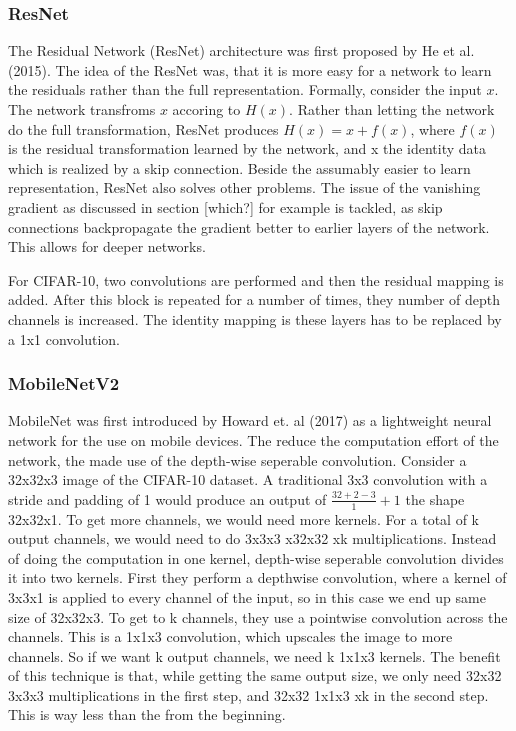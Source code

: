 \subsubsection{ResNet}
The Residual Network (ResNet) architecture was first proposed by He et al.
(2015). The idea of the ResNet was, that it is more easy for a network to learn
the residuals rather than the full representation. Formally, consider the input
$x$. The network transfroms $x$ accoring to $H(x)$. Rather than letting the
network do the full transformation, ResNet produces $H(x)= x +f(x)$, where
$f(x)$ is the residual transformation learned by the network, and x the identity
data which is realized by a skip connection. Beside the assumably easier to
learn representation, ResNet also solves other problems. The issue of the
vanishing gradient as discussed in section [which?] for example is tackled, as
skip connections backpropagate the gradient better to earlier layers of the
network. This allows for deeper networks.

For CIFAR-10, two convolutions are performed and then the residual mapping is
added. After this block is repeated for a number of times, they number of depth
channels is increased. The identity mapping is these layers has to be replaced
by a 1x1 convolution.


\subsubsection{MobileNetV2}
MobileNet was first introduced by Howard et. al (2017) as a lightweight neural
network for the use on mobile devices. The reduce the computation effort of the
network, the made use of the depth-wise seperable convolution. Consider a
32x32x3 image of the CIFAR-10 dataset. A traditional 3x3 convolution with a
stride and padding of 1 would produce an output of $\frac{32+2-3}{1}+1$ the
shape 32x32x1. To get more channels, we would need more kernels. For a total of
k output channels, we would need to do 3x3x3 x32x32 xk multiplications. Instead
of doing the computation in one kernel, depth-wise seperable convolution divides
it into two kernels. First they perform a depthwise convolution, where a kernel
of 3x3x1 is applied to every channel of the input, so in this case we end up
same size of 32x32x3. To get to k channels, they use a pointwise convolution
across the channels. This is a 1x1x3 convolution, which upscales the image to
more channels. So if we want k output channels, we need k 1x1x3 kernels. The
benefit of this technique is that, while getting the same output size, we only
need 32x32 3x3x3 multiplications in the first step, and 32x32 1x1x3 xk in the
second step. This is way less than the from the beginning.


